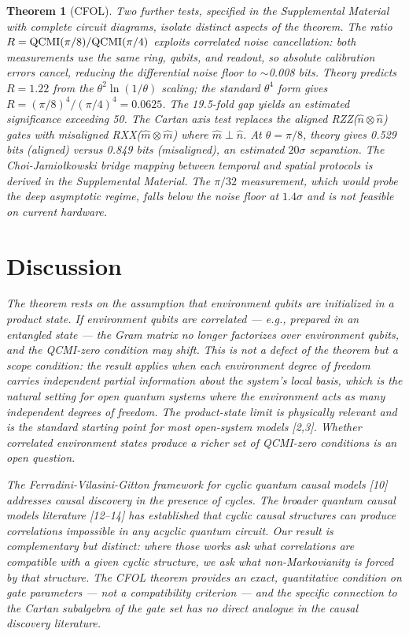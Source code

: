 \documentclass[twocolumn,aps,prl]{revtex4-2}
\newtheorem{theorem}{Theorem}
\begin{document}
\begin{theorem}[CFOL]
Two further tests, specified in the Supplemental Material with complete circuit diagrams, isolate distinct aspects of the theorem. The ratio $R = {\rm QCMI}(\pi/8)/{\rm QCMI}(\pi/4)$ exploits correlated noise cancellation: both measurements use the same ring, qubits, and readout, so absolute calibration errors cancel, reducing the differential noise floor to $\sim$0.008 bits. Theory predicts $R = 1.22$ from the $\theta^2\ln(1/\theta)$ scaling; the standard $\theta^4$ form gives $R = (\pi/8)^4/(\pi/4)^4 = 0.0625$. The 19.5-fold gap yields an estimated significance exceeding 50. The Cartan axis test replaces the aligned RZZ($\hat{n}\otimes\hat{n}$) gates with misaligned RXX($\hat{m}\otimes\hat{m}$) where $\hat{m}\perp\hat{n}$. At $\theta=\pi/8$, theory gives 0.529 bits (aligned) versus 0.849 bits (misaligned), an estimated $20\sigma$ separation. The Choi-Jamio{\l}kowski bridge mapping between temporal and spatial protocols is derived in the Supplemental Material. The $\pi/32$ measurement, which would probe the deep asymptotic regime, falls below the noise floor at $1.4\sigma$ and is not feasible on current hardware.

\section{Discussion}

The theorem rests on the assumption that environment qubits are initialized in a product state. If environment qubits are correlated — e.g., prepared in an entangled state — the Gram matrix no longer factorizes over environment qubits, and the QCMI-zero condition may shift. This is not a defect of the theorem but a scope condition: the result applies when each environment degree of freedom carries independent partial information about the system's local basis, which is the natural setting for open quantum systems where the environment acts as many independent degrees of freedom. The product-state limit is physically relevant and is the standard starting point for most open-system models [2,3]. Whether correlated environment states produce a richer set of QCMI-zero conditions is an open question.

The Ferradini-Vilasini-Gitton framework for cyclic quantum causal models [10] addresses causal discovery in the presence of cycles. The broader quantum causal models literature [12--14] has established that cyclic causal structures can produce correlations impossible in any acyclic quantum circuit. Our result is complementary but distinct: where those works ask what correlations are compatible with a given cyclic structure, we ask what non-Markovianity is forced by that structure. The CFOL theorem provides an exact, quantitative condition on gate parameters — not a compatibility criterion — and the specific connection to the Cartan subalgebra of the gate set has no direct analogue in the causal discovery literature.


\end{theorem}
\end{document}
